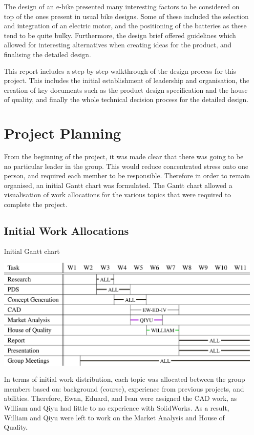 \documentclass[a4paper,11pt]{article}
\begin{document}
The design of an e-bike presented many interesting factors to be considered on top of the ones present in usual bike designs. Some of these included the selection and integration of an electric motor, and the positioning of the batteries as these tend to be quite bulky. Furthermore, the design brief offered guidelines which allowed for interesting alternatives when creating ideas for the product, and finalising the detailed design.

This report includes a step-by-step walkthrough of the design process for this project. This includes the initial establishment of leadership and organisation, the creation of key documents such as the product design specification and the house of quality, and finally the whole technical decision process for the detailed design.

\section{Project Planning}

From the beginning of the project, it was made clear that there was going to be no particular leader in the group. This would reduce concentrated stress onto one person, and required each member to be responsible. Therefore in order to remain organised, an initial Gantt chart was formulated. The Gantt chart allowed a visualisation of work allocations for the various topics that were required to complete the project. 

\subsection{Initial Work Allocations}

\begin{table}[!ht]
	\centering
	\caption{Initial Gantt chart}
	\includegraphics[width=1\textwidth]{gti}
	\label{tab:igc}
\end{table}

In terms of initial work distribution, each topic was allocated between the group members based on: background (course), experience from previous projects, and abilities. Therefore, Ewan, Eduard, and Ivan were assigned the CAD work, as William and Qiyu had little to no experience with SolidWorks. As a result, William and Qiyu were left to work on the Market Analysis and House of Quality.
\end{document}
